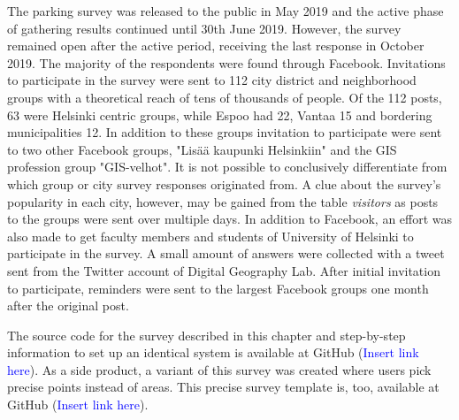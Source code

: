 The parking survey was released to the public in May 2019 and the active phase of gathering results continued until 30th June 2019. However, the survey remained open after the active period, receiving the last response in October 2019. The majority of the respondents were found through Facebook. Invitations to participate in the survey were sent to 112 city district and neighborhood groups with a theoretical reach of tens of thousands of people. Of the 112 posts, 63 were Helsinki centric groups, while Espoo had 22, Vantaa 15 and bordering municipalities 12. In addition to these groups invitation to participate were sent to two other Facebook groups, "Lisää kaupunki Helsinkiin" and the GIS profession group "GIS-velhot". It is not possible to conclusively differentiate from which group or city survey responses originated from. A clue about the survey's popularity in each city, however, may be gained from the table \textit{visitors} as posts to the groups were sent over multiple days. In addition to Facebook, an effort was also made to get faculty members and students of University of Helsinki to participate in the survey. A small amount of answers were collected with a tweet sent from the Twitter account of Digital Geography Lab. After initial invitation to participate, reminders were sent to the largest Facebook groups one month after the original post.

The source code for the survey described in this chapter and step-by-step information to set up an identical system is available at GitHub (\textcolor{blue}{Insert link here}). As a side product, a variant of this survey was created where users pick precise points instead of areas. This precise survey template is, too, available at GitHub (\textcolor{blue}{Insert link here}).

